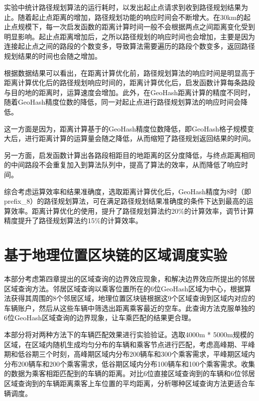 实验中统计路径规划算法的运行耗时，以发出起止点请求到收到路径规划结果为止。随着起止点距离的增加，路径规划功能的响应时间会不断增大。在30km的起止点规模下，每一次启发函数的距离计算时间一般不会根据两点之间距离变化受到明显影响。起止点距离增加后，之所以路径规划的响应时间也会增加，主要是因为连接起止点之间的路段的个数变多，导致算法需要遍历的路段个数变多，返回路径规划结果的时间也会随之增加。

根据数据结果可以看出，在距离计算优化前，路径规划算法的响应时间是明显高于距离计算优化后的路径规划响应时间的，距离计算优化后，启发函数计算每条路段与目的地的距离时，运算速度会增加。此外，在GeoHash距离计算的精度不同时，随着GeoHash精度位数的降低，同一对起止点进行路径规划算法的响应时间会降低。

这一方面是因为，距离计算基于的GeoHash精度位数降低，即GeoHash格子规模变大后，进行距离计算的运算量会随之降低，从而缩短了路径规划返回结果的时间。

另一方面，启发函数计算出各路段相距目的地距离的区分度降低，与终点距离相同的中间路段不会重复加入到算法队列中，提高了算法的效率，从而降低了响应时间。

综合考虑运算效率和结果准确度，选取距离计算优化后，GeoHash精度为8时（即prefix\_8）的路径规划算法，可在满足路径规划结果准确度的条件下达到最高的运算效率。距离计算优化的使用，提升了路径规划算法约20$\%$的计算效率，调节计算精度提升了路径规划算法约15$\%$的计算效率。

\section{基于地理位置区块链的区域调度实验}

本部分考虑第四章提出的区域查询的边界效应现象，和解决边界效应所提出的邻居区域查询方法。邻居区域查询以乘客位置所在的6位GeoHash区域为中心，根据算法获得其周围的8个邻居区域，地理位置区块链根据这9个区域查询到区域内对应的车辆账户，然后从这些车辆中筛选出距离乘客最近的空车。此查询方法克服单独的6位GeoHash区域查询的边界现象，让车乘匹配的结果更合理。

本部分将对两种方法下的车辆匹配效果进行实验验证。选取4000m * 5000m规模的区域，在区域内随机生成均匀分布的车辆和乘客节点进行匹配，考虑高峰期、平峰期和低谷期三个时刻，高峰期区域内分布200辆车和300个乘客需求，平峰期区域内分布200辆车和200个乘客需求，低谷期区域内分布100辆车和100个乘客需求。收集的数据为乘客相距匹配到的车辆的距离。对比6位直接区域查询到的车辆和6位邻居区域查询到的车辆距离乘客上车位置的平均距离，分析哪种区域查询方法更适合车辆调度。

